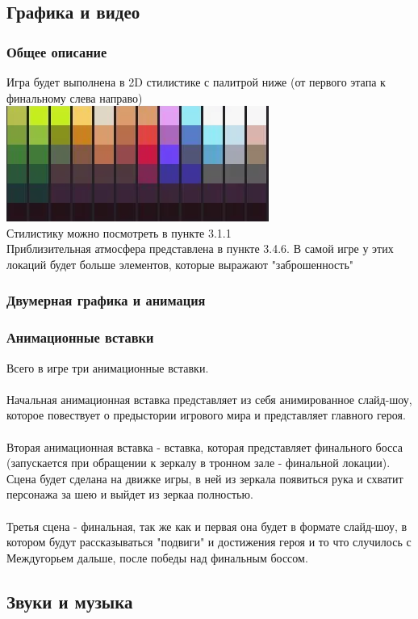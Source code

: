 \documentclass{article}
\begin{document}
\subsection{Графика и видео}
\subsubsection{Общее описание}
Игра будет выполнена в 2D стилистике с палитрой ниже (от первого этапа к финальному слева направо) \\
\includegraphics[width=0.3\linewidth]{images/palitra.png}\\
Стилистику можно посмотреть в пункте 3.1.1
\\
Приблизительная атмосфера представлена в пункте 3.4.6. В самой игре у этих локаций будет больше элементов, которые выражают "заброшенность"


\subsubsection{Двумерная графика и анимация}

\subsubsection{Анимационные вставки}
Всего в игре три анимационные вставки.
\\\\
Начальная анимационная вставка представляет из себя анимированное слайд-шоу, которое повествует о предыстории игрового мира и представляет главного героя.
\\\\
Вторая анимационная вставка - вставка, которая представляет финального босса (запускается при обращении к зеркалу в тронном зале - финальной локации). Сцена будет сделана на движке игры, в ней из зеркала появиться рука и схватит персонажа за шею и выйдет из зеркаа полностью.
\\\\
Третья сцена - финальная, так же как и первая она будет в формате слайд-шоу, в котором будут рассказываться "подвиги" и достижения героя и то что случилось с Междугорьем дальше, после победы над финальным боссом.

\subsection{Звуки и музыка}
\end{document}
